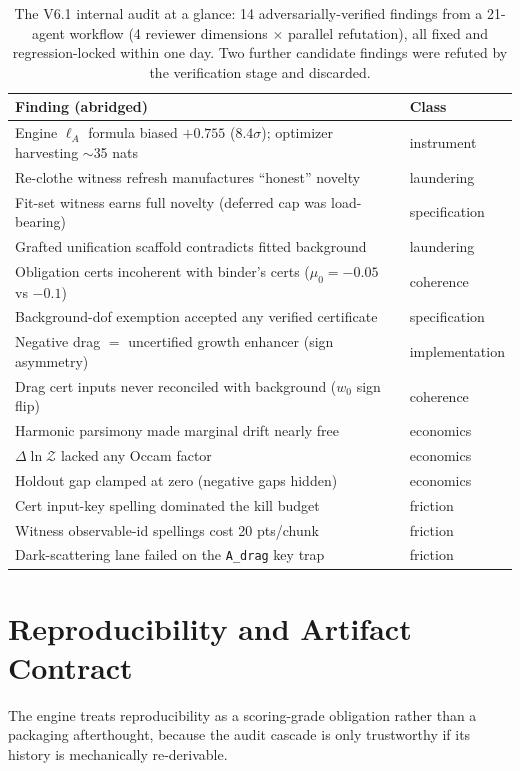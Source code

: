 \documentclass[journal]{IEEEtran}
\newcommand{\lA}{\ell_A}
\begin{document}
\begin{table}[t]
\caption{The V6.1 internal audit at a glance: 14 adversarially-verified findings from a
21-agent workflow (4 reviewer dimensions $\times$ parallel refutation), all fixed and
regression-locked within one day. Two further candidate findings were refuted by the
verification stage and discarded.}
\label{tab:audit}
\centering\footnotesize
\begin{tabular}{@{}p{4.2cm}l@{}}
\toprule
\textbf{Finding (abridged)} & \textbf{Class} \\
\midrule
Engine $\lA$ formula biased $+0.755$ ($8.4\sigma$); optimizer harvesting $\sim$35
nats & instrument \\
Re-clothe witness refresh manufactures ``honest'' novelty & laundering \\
Fit-set witness earns full novelty (deferred cap was load-bearing) & specification \\
Grafted unification scaffold contradicts fitted background & laundering \\
Obligation certs incoherent with binder's certs ($\mu_0{=}{-}0.05$ vs $-0.1$) &
coherence \\
Background-dof exemption accepted any verified certificate & specification \\
Negative drag $=$ uncertified growth enhancer (sign asymmetry) & implementation \\
Drag cert inputs never reconciled with background ($w_0$ sign flip) & coherence \\
Harmonic parsimony made marginal drift nearly free & economics \\
$\Delta\ln\mathcal{Z}$ lacked any Occam factor & economics \\
Holdout gap clamped at zero (negative gaps hidden) & economics \\
Cert input-key spelling dominated the kill budget & friction \\
Witness observable-id spellings cost 20 pts/chunk & friction \\
Dark-scattering lane failed on the \texttt{A\_drag} key trap & friction \\
\bottomrule
\end{tabular}
\end{table}

\section{Reproducibility and Artifact Contract}
\label{sec:repro}
The engine treats reproducibility as a scoring-grade obligation rather than a packaging
afterthought, because the audit cascade is only trustworthy if its history is
mechanically re-derivable.
\end{document}
